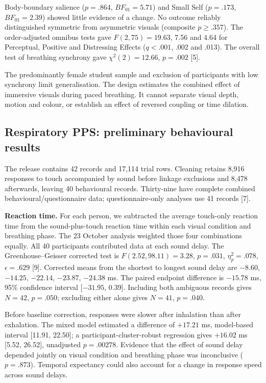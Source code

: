Body-boundary salience ($p=.864$, $BF_{01}=5.71$) and Small Self ($p=.173$, $BF_{01}=2.39$) showed little evidence of a change. No outcome reliably distinguished symmetric from asymmetric visuals (composite $p\geq.357$). The order-adjusted omnibus tests gave $F(2,75)=19.63$, 7.56 and 4.64 for Perceptual, Positive and Distressing Effects ($q<.001$, .002 and .013). The overall test of breathing synchrony gave $\chi^2(2)=12.66$, $p=.002$ [5].

The predominantly female student sample and exclusion of participants with low synchrony limit generalisation. The design estimates the combined effect of immersive visuals during paced breathing. It cannot separate visual depth, motion and colour, or establish an effect of reversed coupling or time dilation.

\subsection{Respiratory PPS: preliminary behavioural results}
\label{sec:pps-results}
The release contains 42 records and 17,114 trial rows. Cleaning retains 8,916 responses to touch accompanied by sound before linkage exclusions and 8,478 afterwards, leaving 40 behavioural records. Thirty-nine have complete combined behavioural/questionnaire data; questionnaire-only analyses use 41 records [7].

\textbf{Reaction time.} For each person, we subtracted the average touch-only reaction time from the sound-plus-touch reaction time within each visual condition and breathing phase. The 23 October analysis weighted those four combinations equally. All 40 participants contributed data at each sound delay. The Greenhouse--Geisser corrected test is $F(2.52,98.11)=3.28$, $p=.031$, $\eta_p^2=.078$, $\epsilon=.629$ [9]. Corrected means from the shortest to longest sound delay are $-8.60$, $-14.25$, $-22.14$, $-23.87$, $-24.38$ ms. The paired endpoint difference is $-15.78$ ms, 95\% confidence interval [$-31.95$, 0.39]. Including both ambiguous records gives $N=42$, $p=.050$; excluding either alone gives $N=41$, $p=.040$.

Before baseline correction, responses were slower after inhalation than after exhalation. The mixed model estimated a difference of $+17.21$ ms, model-based interval [11.91, 22.50]; a participant-cluster-robust regression gives $+16.02$ ms [5.52, 26.52], unadjusted $p=.00278$. Evidence that the effect of sound delay depended jointly on visual condition and breathing phase was inconclusive ($p=.873$). Temporal expectancy could also account for a change in response speed across sound delays.


